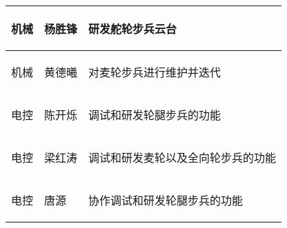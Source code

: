 \begin{longtable}{ p{2cm} | p{3.5cm} | p{9.3cm} |}
    \hline

        \begin{center}
            机械
        \end{center}&
        \begin{center}
            杨胜锋
        \end{center}&
        \begin{center}
            研发舵轮步兵云台
        \end{center}\\
        
    \hline
    
        \begin{center}
            机械
        \end{center}&
        \begin{center}
            黄德曦
        \end{center}&
        \begin{center}
            对麦轮步兵进行维护并迭代
        \end{center}\\

    \hline
    
        \begin{center}
            电控
        \end{center}&
        \begin{center}
            陈开烁
        \end{center}&
        \begin{center}
            调试和研发轮腿步兵的功能
        \end{center}\\
        
    \hline
    
        \begin{center}
            电控
        \end{center}&
        \begin{center}
            梁红涛
        \end{center}&
        \begin{center}
            调试和研发麦轮以及全向轮步兵的功能
        \end{center}\\

    \hline
    
        \begin{center}
            电控
        \end{center}&
        \begin{center}
            唐源
        \end{center}&
        \begin{center}
            协作调试和研发轮腿步兵的功能
        \end{center}\\


\end{longtable}
